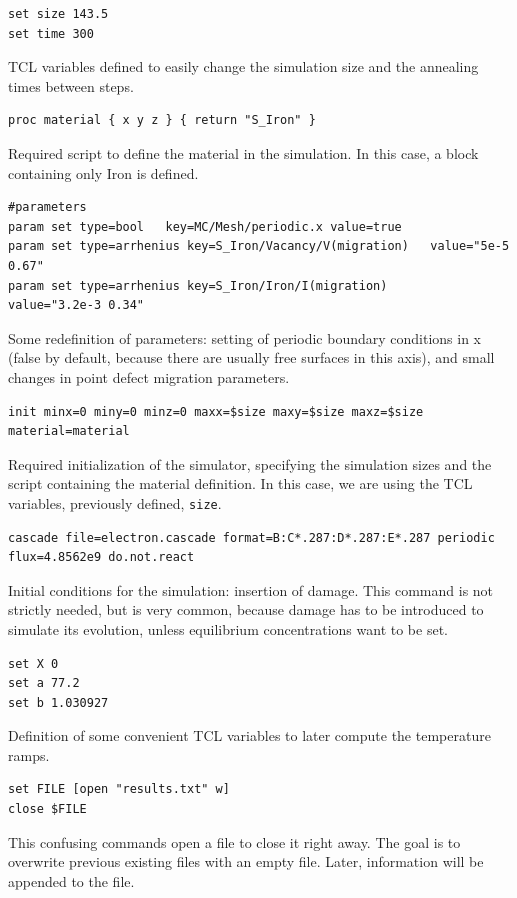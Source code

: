 \begin{lstlisting}[firstnumber=2]
set size 143.5
set time 300
\end{lstlisting}
TCL variables defined to easily change the simulation size and the annealing times between steps.

\begin{lstlisting}[firstnumber=5]
proc material { x y z } { return "S_Iron" }
\end{lstlisting}
Required script to define the material in the simulation. In this case, a block containing only Iron is defined.

\begin{lstlisting}[firstnumber=7]
#parameters
param set type=bool   key=MC/Mesh/periodic.x value=true
param set type=arrhenius key=S_Iron/Vacancy/V(migration)   value="5e-5 0.67"
param set type=arrhenius key=S_Iron/Iron/I(migration)      value="3.2e-3 0.34"
\end{lstlisting}
Some redefinition of parameters: setting of periodic boundary conditions in x (false by default, because there are usually free surfaces in this axis), and small changes in point defect migration parameters.

\begin{lstlisting}[firstnumber=13]
init minx=0 miny=0 minz=0 maxx=$size maxy=$size maxz=$size material=material
\end{lstlisting}
Required initialization of the simulator, specifying the simulation sizes and the script containing the material definition. In this case, we are using the TCL variables, previously defined, {\tt size}.

\begin{lstlisting}[firstnumber=15]
cascade file=electron.cascade format=B:C*.287:D*.287:E*.287 periodic flux=4.8562e9 do.not.react
\end{lstlisting}
Initial conditions for the simulation: insertion of damage. This command is not strictly needed, but is very common, because damage has to be introduced to simulate its evolution, unless equilibrium concentrations want to be set.

\begin{lstlisting}[firstnumber=17]
set X 0
set a 77.2
set b 1.030927
\end{lstlisting}
Definition of some convenient TCL variables to later compute the temperature ramps.

\begin{lstlisting}[firstnumber=21]
set FILE [open "results.txt" w]
close $FILE
\end{lstlisting}
This confusing commands open a file to close it right away. The goal is to overwrite previous existing files with an empty file. Later, information will be appended to the file.

